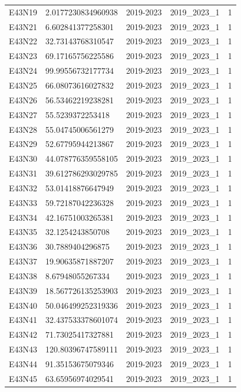 \begin{landscape}
\begin{longtable}{lllll}
E43N19 & 2.0177230834960938 & 2019-2023 & 2019\_2023\_1 & 1 \\
E43N21 & 6.602841377258301 & 2019-2023 & 2019\_2023\_1 & 1 \\
E43N22 & 32.73143768310547 & 2019-2023 & 2019\_2023\_1 & 1 \\
E43N23 & 69.17165756225586 & 2019-2023 & 2019\_2023\_1 & 1 \\
E43N24 & 99.99556732177734 & 2019-2023 & 2019\_2023\_1 & 1 \\
E43N25 & 66.08073616027832 & 2019-2023 & 2019\_2023\_1 & 1 \\
E43N26 & 56.53462219238281 & 2019-2023 & 2019\_2023\_1 & 1 \\
E43N27 & 55.5239372253418 & 2019-2023 & 2019\_2023\_1 & 1 \\
E43N28 & 55.04745006561279 & 2019-2023 & 2019\_2023\_1 & 1 \\
E43N29 & 52.67795944213867 & 2019-2023 & 2019\_2023\_1 & 1 \\
E43N30 & 44.078776359558105 & 2019-2023 & 2019\_2023\_1 & 1 \\
E43N31 & 39.612786293029785 & 2019-2023 & 2019\_2023\_1 & 1 \\
E43N32 & 53.01418876647949 & 2019-2023 & 2019\_2023\_1 & 1 \\
E43N33 & 59.72187042236328 & 2019-2023 & 2019\_2023\_1 & 1 \\
E43N34 & 42.16751003265381 & 2019-2023 & 2019\_2023\_1 & 1 \\
E43N35 & 32.1254243850708 & 2019-2023 & 2019\_2023\_1 & 1 \\
E43N36 & 30.7889404296875 & 2019-2023 & 2019\_2023\_1 & 1 \\
E43N37 & 19.90635871887207 & 2019-2023 & 2019\_2023\_1 & 1 \\
E43N38 & 8.67948055267334 & 2019-2023 & 2019\_2023\_1 & 1 \\
E43N39 & 18.567726135253903 & 2019-2023 & 2019\_2023\_1 & 1 \\
E43N40 & 50.046499252319336 & 2019-2023 & 2019\_2023\_1 & 1 \\
E43N41 & 32.437533378601074 & 2019-2023 & 2019\_2023\_1 & 1 \\
E43N42 & 71.73025417327881 & 2019-2023 & 2019\_2023\_1 & 1 \\
E43N43 & 120.80396747589111 & 2019-2023 & 2019\_2023\_1 & 1 \\
E43N44 & 91.35153675079346 & 2019-2023 & 2019\_2023\_1 & 1 \\
E43N45 & 63.65956974029541 & 2019-2023 & 2019\_2023\_1 & 1 \\

\end{longtable}
\end{landscape}
